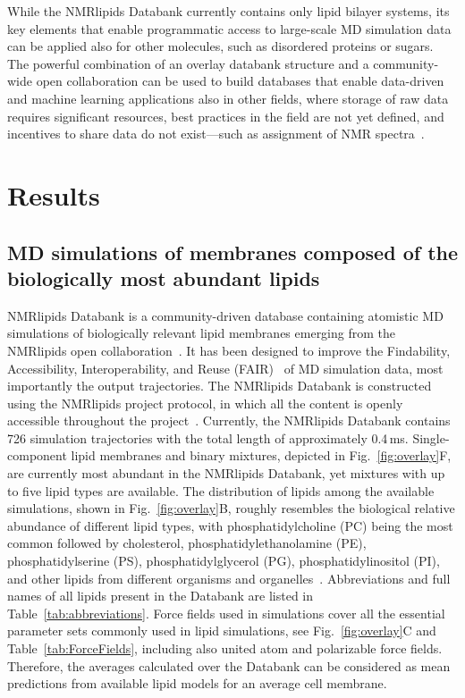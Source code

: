 \documentclass[fleqn,10pt]{wlscirep}
\begin{document}
While the NMRlipids Databank currently contains only lipid bilayer systems, its key elements that enable programmatic access to large-scale MD simulation data can be applied also for other molecules, such as disordered proteins or sugars. The powerful combination of an overlay databank structure and a community-wide open collaboration can be used to build databases that enable data-driven and machine learning applications also in other fields, where storage of raw data requires significant resources, best practices in the field are not yet defined, and incentives to share data do not exist---such as assignment of NMR spectra~\cite{klukowski22}. 



\section{Results}

\subsection{MD simulations of membranes composed of the biologically most  abundant lipids}

NMRlipids Databank is a community-driven database containing atomistic MD simulations of biologically relevant lipid membranes emerging from the NMRlipids open collaboration~\cite{botan15,ollila16,catte16,antila19,bacle21}. It has been designed to improve the Findability, Accessibility, Interoperability, and Reuse (FAIR)~\cite{wilkinson16} of MD simulation data, most importantly the output trajectories. The NMRlipids Databank is constructed using the NMRlipids project protocol, in which all the content is openly accessible throughout the project~\cite{botan15}. Currently, the NMRlipids Databank contains 726 simulation trajectories with the total length of approximately 0.4\,ms. Single-component lipid membranes and binary mixtures, depicted in Fig.~\ref{fig:overlay}F, are currently most abundant in the NMRlipids Databank, yet mixtures with up to five lipid types are available. The distribution of lipids among the available simulations, shown in Fig.~\ref{fig:overlay}B, roughly resembles the biological relative abundance of different lipid types, with phosphatidylcholine (PC) being the most common followed by cholesterol, phosphatidylethanolamine (PE), phosphatidylserine (PS), phosphatidylglycerol (PG), phosphatidylinositol (PI), and other lipids from different organisms and organelles~\cite{vanmeer08}. Abbreviations and full names of all lipids present in the Databank are listed in Table~\ref{tab:abbreviations}. Force fields used in simulations cover all the essential parameter sets commonly used in lipid simulations, see Fig.~\ref{fig:overlay}C and Table~\ref{tab:ForceFields}, including also united atom and polarizable force fields. Therefore, the averages calculated over the Databank can be considered as mean predictions from available lipid models for an average cell membrane.
\end{document}
